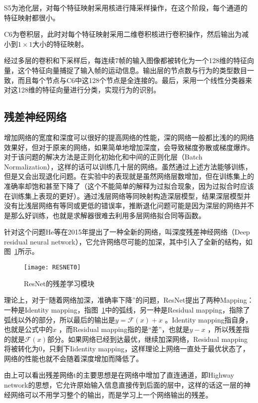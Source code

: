S5为池化层，对每个特征映射采用核进行降采样操作，在这个阶段，每个通道的特征映射都很小。

C6为卷积层，此时对每个特征映射采用二维卷积核进行卷积操作，然后输出为减小到$1×1$大小的特征映射。

经过多层的卷积和下采样后，每连续7帧的输入图像都被转化为一个128维的特征向量，这个特征向量捕捉了输入帧的运动信息。输出层的节点数与行为的类型数目一致，而且每个节点与C6中这128个节点是全连接的。最后，采用一个线性分类器来对这128维的特征向量进行分类，实现行为的识别。

\subsection{残差神经网络}

增加网络的宽度和深度可以很好的提高网络的性能，深的网络一般都比浅的的网络效果好，但对于原来的网络，如果简单地增加深度，会导致梯度弥散或梯度爆炸。对于该问题的解决方法是正则化初始化和中间的正则化层（Batch Normalization），这样的话可以训练几十层的网络。虽然通过上述方法能够训练，但是又会出现退化问题。在实验中的表现就是虽然网络层数增加，但在训练集上的准确率却饱和甚至下降了（这个不能简单的解释为过拟合现象，因为过拟合时应该在训练集上表现的更好）。通过浅层网络等同映射构造深层模型，结果深层模型并没有比浅层网络有等同或更低的错误率，推断退化问题可能是因为深层的网络并不是那么好训练，也就是求解器很难去利用多层网络拟合同等函数。

针对这个问题He等在2015年提出了一种全新的网络，叫深度残差神经网络（Deep residual neural network），它允许网络尽可能的加深，其中引入了全新的结构，如图~\ref{fig9}所示\citep{he2016deep}。

\begin{figure}[!htbp]
    \centering
    \texttt{[image: RESNET0]}
    \caption{ResNet的残差学习模块}
    \label{fig9}
\end{figure}

理论上，对于“随着网络加深，准确率下降”的问题，ResNet提出了两种Mapping：一种是Identity mapping，指图~\ref{fig9}中的弧线，另一种是Residual mapping，指除了弧线以外的部分，所以最后的输出是$y=\mathcal{F}\left ( x \right )+x$ 。Identity mapping指自身，也就是公式中的$x$ ，而Residual mapping指的是“差”，也就是$y-x$ ，所以残差指的就是$\mathcal{F}\left (x \right )$部分。如果网络已经到达最优，继续加深网络，Residual mapping将被转化为0，只剩下Iidentity mapping，这样理论上网络一直处于最优状态了，网络的性能也就不会随着深度增加而降低了。

由上可以看出残差网络t的主要思想是在网络中增加了直连通道，即Highway network的思想，它允许原始输入信息直接传到后面的层中\citep{Srivastava2015Highway}，这样的话这一层的神经网络可以不用学习整个的输出，而是学习上一个网络输出的残差。

